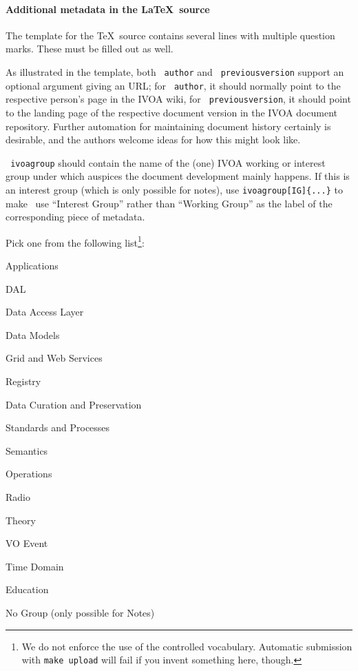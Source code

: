 \documentclass[11pt,a4paper]{ivoa}
\newcommand{\texword}[1]{\texttt{\color{texcolor} #1}}
\begin{document}
\paragraph{Additional metadata in the \LaTeX~source}

The template for the \TeX\ source contains several lines with
multiple question marks.  These must be filled out as well.

As illustrated in the template, both \texword{author} and
\texword{previousversion} support an optional argument giving an URL; for
\texword{author}, it should normally point to the respective person's
page in the IVOA wiki, for \texword{previousversion}, it should point to
the landing page of the respective document version in the IVOA document
repository.  Further automation for maintaining document history
certainly is desirable, and the authors welcome ideas for how this might
look like.

\texword{ivoagroup} should contain the name of the (one) IVOA working or
interest group under which auspices the document development mainly
happens.  If this is an interest group (which is only possible for
notes), use \verb|ivoagroup[IG]{...}| to make \ivoatex~use ``Interest
Group'' rather than ``Working Group'' as the label of the corresponding
piece of metadata.

Pick one from the following list\footnote{We do not
enforce the use of the controlled vocabulary.  Automatic submission
with \texttt{make upload} will fail if you invent something here,
though.}:

\begin{compactitem}
\item Applications
\item DAL
\item Data Access Layer
\item Data Models
\item Grid and Web Services
\item Registry
\item Data Curation and Preservation
\item Standards and Processes
\item Semantics
\item Operations
\item Radio
\item Theory
\item VO Event
\item Time Domain
\item Education
\item No Group (only possible for Notes)
\end{compactitem}
\end{document}
